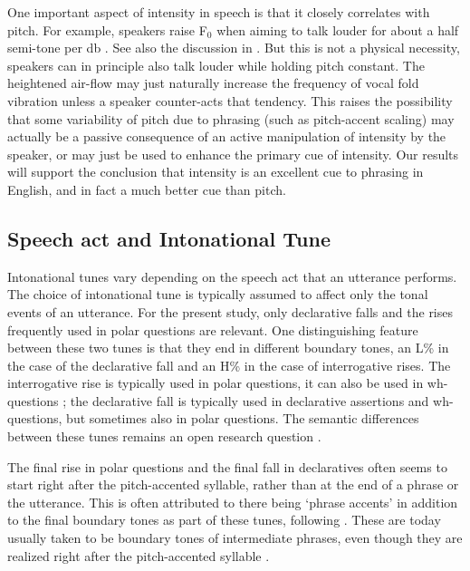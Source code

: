 \documentclass[preprint,review,12pt,authoryear,times]{elsarticle}
\begin{document}
One important aspect of intensity in speech is that it closely correlates with pitch. For example, speakers raise F$_0$ when aiming to talk louder for about a half semi-tone per db \citep{gramm88}. See also the discussion in \citet{vaiss83}. But this is not a physical necessity, speakers can in principle also talk louder while holding pitch constant. The heightened air-flow may just naturally increase the frequency of vocal fold vibration unless a speaker counter-acts that tendency. This raises the possibility that some variability of pitch due to phrasing (such as pitch-accent scaling) may actually be a passive consequence of an active manipulation of intensity by the speaker, or may just be used to enhance the primary cue of intensity. Our results will support the conclusion that intensity is an excellent cue to phrasing in English, and in fact a much better cue than pitch.



\subsection{Speech act and Intonational Tune}

Intonational tunes vary depending on the speech act that an utterance performs. The choice of intonational tune is typically assumed to affect only the tonal events of an utterance. For the present study, only declarative falls and the rises frequently used in polar questions are relevant. One distinguishing feature between these two tunes is that they end in different boundary tones, an L\% in the case of the declarative fall and an H\% in the case of interrogative rises. The interrogative rise is typically used in polar questions, it can also be used in wh-questions \citep{hedbe14}; the declarative fall is typically used in declarative assertions and wh-questions, but sometimes also in polar questions. The semantic differences between these tunes remains an open research question \citep[see][for a review]{truck12}. 

The final rise in polar questions and the final fall in declaratives often seems to start right after the pitch-accented syllable, rather than at the end of a phrase or the utterance. This is often attributed to there being `phrase accents' in addition to the final boundary tones as part of these tunes, following \citep{pierr80}. These are today usually taken to be boundary tones of intermediate phrases, even though they are realized right after the pitch-accented syllable \citep[see][for a review and empirical evidence in favor of phrase accents]{grice00}. 
\end{document}
